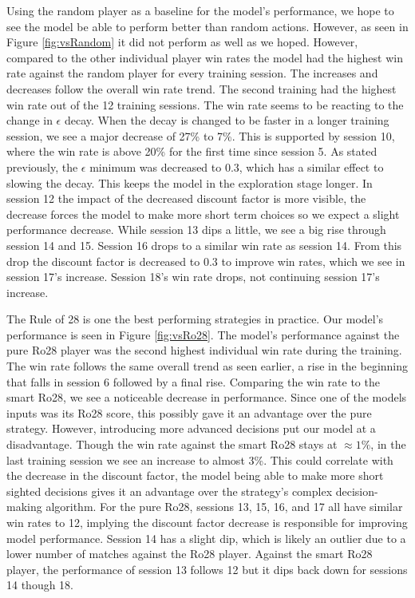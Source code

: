 \documentclass[12pt]{article}
\begin{document}
\begin{thesis}
Using the random player as a baseline for the model's performance, we hope to see the model be able to perform better than random actions. However, as seen in Figure \ref{fig:vsRandom} it did not perform as well as we hoped. However, compared to the other individual player win rates the model had the highest win rate against the random player for every training session. The increases and decreases follow the overall win rate trend. The second training had the highest win rate out of the 12 training sessions. The win rate seems to be reacting to the change in \(\epsilon\) decay. When the decay is changed to be faster in a longer training session, we see a major decrease of 27\% to 7\%. This is supported by session 10, where the win rate is above 20\% for the first time since session 5. As stated previously, the \(\epsilon\) minimum was decreased to 0.3, which has a similar effect to slowing the decay. This keeps the model in the exploration stage longer. In session 12 the impact of the decreased discount factor is more visible, the decrease forces the model to make more short term choices so we expect a slight performance decrease. While session 13 dips a little, we see a big rise through session 14 and 15. Session 16 drops to a similar win rate as session 14. From this drop the discount factor is decreased to 0.3 to improve win rates, which we see in session 17's increase. Session 18's win rate drops, not continuing session 17's increase.

The Rule of 28 is one the best performing strategies in practice. Our model's performance is seen in Figure \ref{fig:vsRo28}. The model's performance against the pure Ro28 player was the second highest individual win rate during the training. The win rate follows the same overall trend as seen earlier, a rise in the beginning that falls in session 6 followed by a final rise. Comparing the win rate to the smart Ro28, we see a noticeable decrease in performance. Since one of the models inputs was its Ro28 score, this possibly gave it an advantage over the pure strategy. However, introducing more advanced decisions put our model at a disadvantage. Though the win rate against the smart Ro28 stays at \(\approx1\%\), in the last training session we see an increase to almost 3\%. This could correlate with the decrease in the discount factor, the model being able to make more short sighted decisions gives it an advantage over the strategy's complex decision-making algorithm. For the pure Ro28, sessions 13, 15, 16, and 17 all have similar win rates to 12, implying the discount factor decrease is responsible for improving model performance. Session 14 has a slight dip, which is likely an outlier due to a lower number of matches against the Ro28 player. Against the smart Ro28 player, the performance of session 13 follows 12 but it dips back down for sessions 14 though 18.


\end{thesis}
\end{document}
